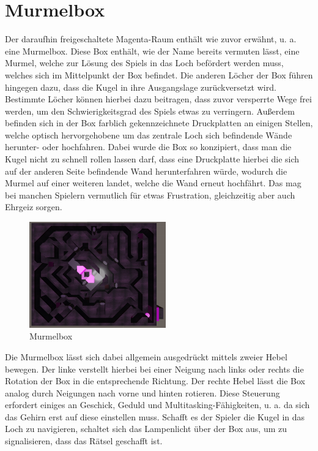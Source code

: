 \section{Murmelbox}
Der daraufhin freigeschaltete Magenta-Raum enthält wie zuvor erwähnt, u. a. eine Murmelbox. Diese Box enthält, wie der Name bereits vermuten lässt, eine Murmel, welche zur Lösung des Spiels in das Loch befördert werden muss, welches sich im Mittelpunkt der Box befindet. Die anderen Löcher der Box führen hingegen dazu, dass die Kugel in ihre Ausgangslage zurückversetzt wird. Bestimmte Löcher können hierbei dazu beitragen, dass zuvor versperrte Wege frei werden, um den Schwierigkeitsgrad des Spiels etwas zu verringern. Außerdem befinden sich in der Box farblich gekennzeichnete Druckplatten an einigen Stellen, welche optisch hervorgehobene um das zentrale Loch sich befindende Wände herunter- oder hochfahren. Dabei wurde die Box so konzipiert, dass man die Kugel nicht zu schnell rollen lassen darf, dass eine Druckplatte hierbei die sich auf der anderen Seite befindende Wand herunterfahren würde, wodurch die Murmel auf einer weiteren landet, welche die Wand erneut hochfährt. Das mag bei manchen Spielern vermutlich für etwas Frustration, gleichzeitig aber auch Ehrgeiz sorgen.\\
\begin{figure}
	\vspace*{-0.5cm}
	\includegraphics[width=5.9cm]{Pictures/Murmelbox}
	\caption{Murmelbox}
	\vspace*{-0.5cm}
	\label{fig:murmelbox}
\end{figure}
Die Murmelbox lässt sich dabei allgemein ausgedrückt mittels zweier Hebel bewegen. Der linke verstellt hierbei bei einer Neigung nach links oder rechts die Rotation der Box in die entsprechende Richtung. Der rechte Hebel lässt die Box analog durch Neigungen nach vorne und hinten rotieren. Diese Steuerung erfordert einiges an Geschick, Geduld und Multitasking-Fähigkeiten, u. a. da sich das Gehirn erst auf diese einstellen muss. Schafft es der Spieler die Kugel in das Loch zu navigieren, schaltet sich das Lampenlicht über der Box aus, um zu signalisieren, dass das Rätsel geschafft ist.
